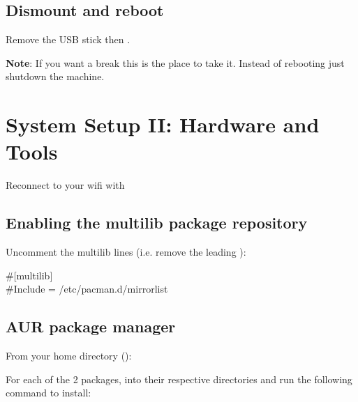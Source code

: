 \subsection{Dismount and reboot}


Remove the USB stick then .

\textbf{Note}: If you want a break this is the place to take it. Instead of rebooting just shutdown the machine.

\section{System Setup II: Hardware and Tools}

Reconnect to your wifi with 

\subsection{Enabling the multilib package repository}

\begin{blocksection}
    Uncomment the multilib lines (i.e. remove the leading \code{\#}):
    \begin{codeblock}
        \#[multilib]\\
        \#Include = /etc/pacman.d/mirrorlist
    \end{codeblock}
\end{blocksection}

\subsection{AUR package manager}

From your home directory ():


For each of the 2 packages,  into their respective directories and run the following command to install:

